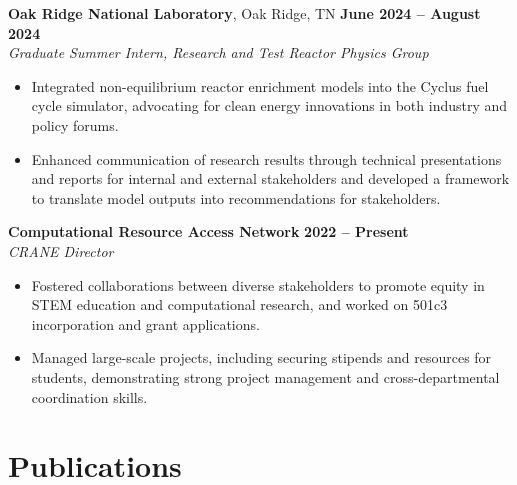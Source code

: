 \documentclass[margin,line]{resume}
\begin{document}
\begin{resume}
    \textbf{Oak Ridge National Laboratory}, Oak Ridge, TN \hfill \textbf{June 2024 -- August 2024} \\
    \textsl{Graduate Summer Intern, Research and Test Reactor Physics Group} \\
    \begin{itemize}
        \item Integrated non-equilibrium reactor enrichment models into the Cyclus fuel cycle simulator, advocating for clean energy innovations in both industry and policy forums.
        \item Enhanced communication of research results through technical presentations and reports for internal and external stakeholders and developed a framework to translate model outputs into recommendations for stakeholders.
    \end{itemize}

    \textbf{Computational Resource Access Network} \hfill \textbf{2022 -- Present} \\
    \textsl{CRANE Director} \\
    \begin{itemize}
        \item Fostered collaborations between diverse stakeholders to promote equity in STEM education and computational research, and worked on 501c3 incorporation and grant applications.
        \item Managed large-scale projects, including securing stipends and resources for students, demonstrating strong project management and cross-departmental coordination skills.
    \end{itemize}
    \vspace{-4mm}
    \section{\mysidestyle Publications}

    \begin{bibenum}
        \item {}
        \item {}
        \item {}
        \item {}
    \end{bibenum}


\end{resume}
\end{document}

